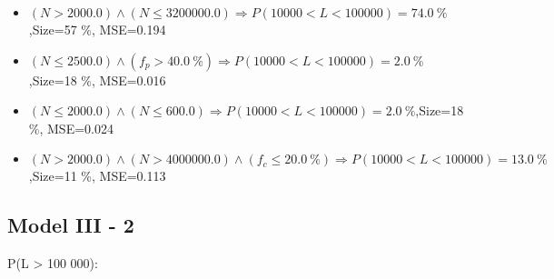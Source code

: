 \documentclass[numbered]{CSL}
\begin{document}
\begin{itemize}
\item $(N > 2000.0) \land (N \leq 3200000.0) \Rightarrow P(10 000 < L < 100 000) = 74.0~\%$,\hfill Size=57 \%, MSE=0.194
\item $(N \leq 2500.0) \land (f_p > 40.0~\%) \Rightarrow P(10 000 < L < 100 000) = 2.0~\%$,\hfill Size=18 \%, MSE=0.016
\item $(N \leq 2000.0) \land (N \leq 600.0) \Rightarrow P(10 000 < L < 100 000) = 2.0~\%$,\hfill Size=18 \%, MSE=0.024
\item $(N > 2000.0) \land (N > 4000000.0) \land (f_c \leq 20.0~\%) \Rightarrow P(10 000 < L < 100 000) = 13.0~\%$,\hfill Size=11 \%, MSE=0.113
\end{itemize}

\subsection{Model III - 2}
P(L > 100 000):
\end{document}
